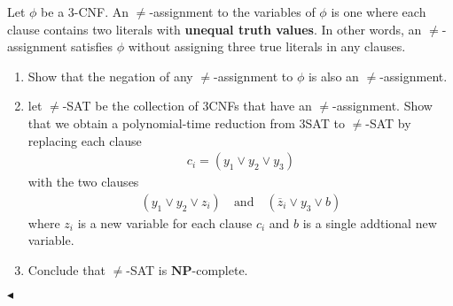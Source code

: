 \documentclass[11pt]{article}
\newcommand{\NP}{\mathbf{NP}}
\newenvironment{problem}[2][Problem]{\begin{trivlist}
\item[\hskip \labelsep{\bfseries#1}\hskip\labelsep{\bfseries#2.}]}{\hfill$\blacktriangleleft$\end{trivlist}}
\begin{document}
\begin{problem}{6.(28 points)}
    Let $\phi$ be a 3-CNF. An $\neq$-assignment to the variables of $\phi$ is one where each clause contains two literals with \textbf{unequal truth values}. In other words, an $\neq$-assignment satisfies $\phi$ without assigning three true literals in any clauses.
    \begin{enumerate}[label = \alph*.)]
        \item Show that the negation of any $\neq$-assignment to $\phi$ is also an $\neq$-assignment.
        \item let $\neq$-SAT be the collection of 3CNFs that have an $\neq$-assignment. Show that we obtain a polynomial-time reduction from 3SAT to $\neq$-SAT by replacing each clause 
        \begin{align*}
            c_i = (y_1 \lor y_2 \lor y_3)
        \end{align*}
        with the two clauses
        \begin{align*}
            (y_1 \lor y_2 \lor z_i) \quad \text{and} \quad (\overline{z}_i \lor y_3 \lor b)
        \end{align*}
        where $z_i$ is a new variable for each clause $c_i$ and $b$ is a single addtional new variable.
        \item Conclude that $\neq$-SAT is $\NP$-complete. 
    \end{enumerate}
\end{problem}
\end{document}

